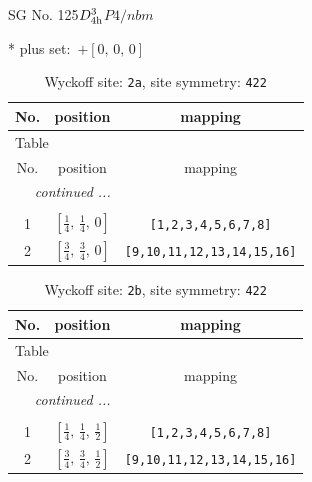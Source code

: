 \documentclass[fleqn,8pt]{jsarticle}
\begin{document}
\setcounter{MaxMatrixCols}{32}

\renewcommand{\tablename}{Table~}
\renewcommand{\figurename}{Figure~}
\begin{center}
\LARGE
SG No. 125\quad$D_{\rm 4h}^{3}$\quad$P4/nbm$\quad[ tetragonal ]
\end{center}
* plus set:\,\,\,$+\left[ 0,\, 0,\, 0 \right]$
\renewcommand{\arraystretch}{1.2}
\begin{longtable}{ccc}
\caption{Wyckoff site: {\tt 2a}, site symmetry: {\tt 422}}
 \\
 \hline \hline
No. & position & mapping \\ \hline \endfirsthead

\multicolumn{2}{l}{\tablename\ \thetable{}} \\
 \hline \hline
No. & position & mapping \\ \hline \endhead

 \hline \hline
\multicolumn{2}{r}{\footnotesize\it continued ...} \\ \endfoot

 \hline \hline
\multicolumn{2}{r}{} \\ \endlastfoot

1 & $\left[ \frac{1}{4},\, \frac{1}{4},\, 0 \right]$ & {\tt [1,2,3,4,5,6,7,8]} \\ \hline
2 & $\left[ \frac{3}{4},\, \frac{3}{4},\, 0 \right]$ & {\tt [9,10,11,12,13,14,15,16]} \\
\end{longtable}
\renewcommand{\arraystretch}{1.2}
\begin{longtable}{ccc}
\caption{Wyckoff site: {\tt 2b}, site symmetry: {\tt 422}}
 \\
 \hline \hline
No. & position & mapping \\ \hline \endfirsthead

\multicolumn{2}{l}{\tablename\ \thetable{}} \\
 \hline \hline
No. & position & mapping \\ \hline \endhead

 \hline \hline
\multicolumn{2}{r}{\footnotesize\it continued ...} \\ \endfoot

 \hline \hline
\multicolumn{2}{r}{} \\ \endlastfoot

1 & $\left[ \frac{1}{4},\, \frac{1}{4},\, \frac{1}{2} \right]$ & {\tt [1,2,3,4,5,6,7,8]} \\ \hline
2 & $\left[ \frac{3}{4},\, \frac{3}{4},\, \frac{1}{2} \right]$ & {\tt [9,10,11,12,13,14,15,16]} \\
\end{longtable}
\end{document}
